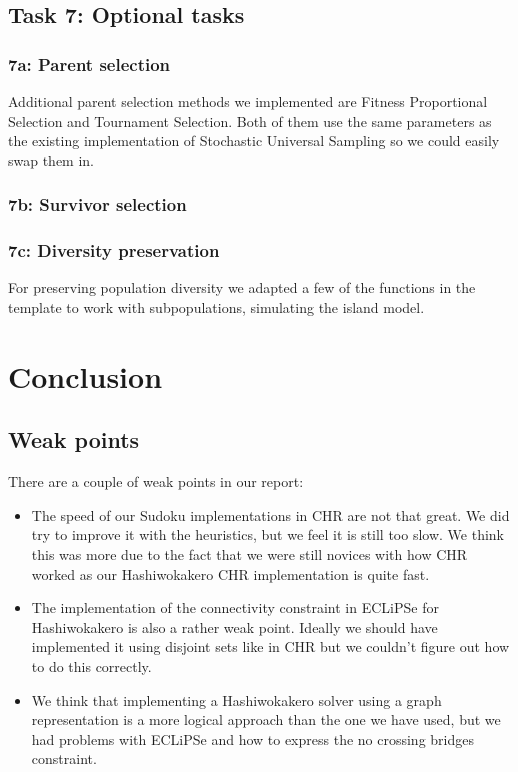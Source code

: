 \documentclass{report}
\newcommand{\mychapter}[2]{
    \setcounter{chapter}{#1}
    \setcounter{section}{0}
    \chapter*{#2}
    \addcontentsline{toc}{chapter}{#2}
}
\begin{document}
\section{Task 7: Optional tasks}
\subsection{7a: Parent selection}
Additional parent selection methods we implemented are Fitness Proportional Selection and Tournament Selection. Both of them use the same parameters as the existing implementation of Stochastic Universal Sampling so we could easily swap them in.

\subsection{7b: Survivor selection}
\subsection{7c: Diversity preservation}
For preserving population diversity we adapted a few of the functions in the template to work with subpopulations, simulating the island model.

\newpage

\mychapter{2}{Conclusion}

\section{Weak points}
There are a couple of weak points in our report:
\begin{itemize}
    \item The speed of our Sudoku implementations in CHR are not that great. We did try to improve it with the heuristics, but we feel it is still too slow. We think this was more due to the fact that we were still novices with how CHR worked as our Hashiwokakero CHR implementation is quite fast.
    \item The implementation of the connectivity constraint in ECLiPSe for Hashiwokakero is also a rather weak point. Ideally we should have implemented it using disjoint sets like in CHR but we couldn't figure out how to do this correctly.
    \item We think that implementing a Hashiwokakero solver using a graph representation is a more logical approach than the one we have used, but we had problems with ECLiPSe and how to express the no crossing bridges constraint.
\end{itemize}
\end{document}
